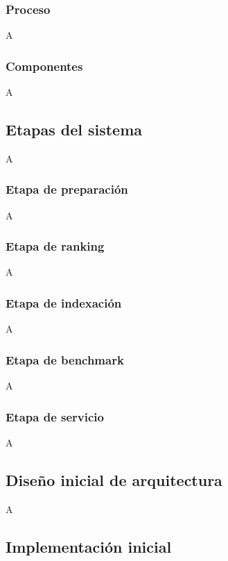 \subsubsection{Proceso}

A

\subsubsection{Componentes}

A

\subsection{Etapas del sistema}

A

\subsubsection{Etapa de preparación}

A

\subsubsection{Etapa de ranking}

A

\subsubsection{Etapa de indexación}

A

\subsubsection{Etapa de benchmark}

A

\subsubsection{Etapa de servicio}

A

\subsection{Diseño inicial de arquitectura}

A

\subsection{Implementación inicial}

